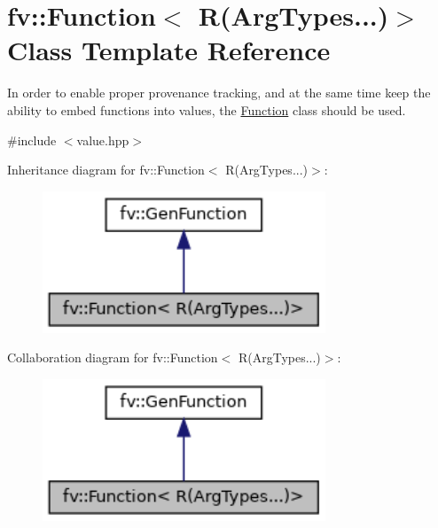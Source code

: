 \hypertarget{classfv_1_1Function_3_01R_07ArgTypes_8_8_8_08_4}{}\section{fv\+:\+:Function$<$ R(Arg\+Types...)$>$ Class Template Reference}
\label{classfv_1_1Function_3_01R_07ArgTypes_8_8_8_08_4}


In order to enable proper provenance tracking, and at the same time keep the ability to embed functions into values, the \hyperlink{classfv_1_1Function}{Function} class should be used.  




{\ttfamily \#include $<$value.\+hpp$>$}



Inheritance diagram for fv\+:\+:Function$<$ R(Arg\+Types...)$>$\+:
\nopagebreak
\begin{figure}[H]
\begin{center}
\leavevmode
\includegraphics[width=239pt]{classfv_1_1Function_3_01R_07ArgTypes_8_8_8_08_4__inherit__graph}
\end{center}
\end{figure}


Collaboration diagram for fv\+:\+:Function$<$ R(Arg\+Types...)$>$\+:
\nopagebreak
\begin{figure}[H]
\begin{center}
\leavevmode
\includegraphics[width=239pt]{classfv_1_1Function_3_01R_07ArgTypes_8_8_8_08_4__coll__graph}
\end{center}
\end{figure}
